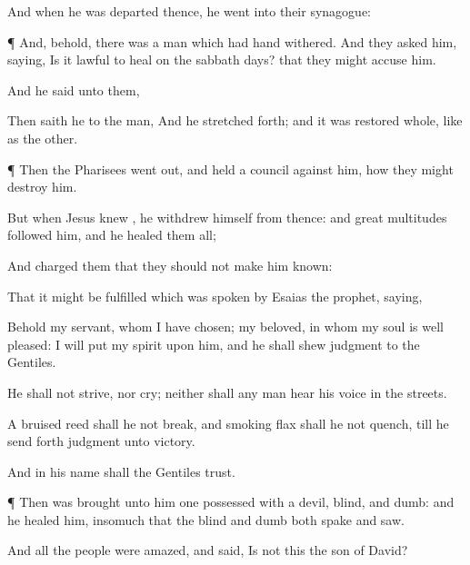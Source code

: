 {

And when he was
departed
thence, he
went
into
their
synagogue:


\par }{\PP {}¶
And,
behold, there
was a
man which
had
{}
hand
withered.
And they
asked
him,
saying, Is it
lawful to
heal on the sabbath
days?
that they might
accuse
him.

And
he
said unto
them,
{}


Then saith
he to the
man,
{}
And he
stretched
{}
forth;
and it was
restored
whole, like
as the
other.


\par }{\PP {}¶
Then the
Pharisees went
out, and
held a
council
against
him,
how they might
destroy
him.

But
when
Jesus
knew
{}, he withdrew
himself from
thence:
and
great
multitudes
followed
him,
and he
healed
them
all;

And
charged
them
that they
should
not
make
him
known:

That it might be
fulfilled which was
spoken
by
Esaias the
prophet,
saying,

Behold
my
servant,
whom I have
chosen;
my
beloved,
in
whom
my
soul is well
pleased: I will
put
my
spirit
upon
him,
and he shall
shew
judgment to the
Gentiles.

He
shall
not
strive,
nor
cry;
neither
shall any
man
hear
his
voice
in the
streets.

A
bruised
reed shall
he
not
break,
and
smoking
flax shall
he
not
quench,
till he send
forth
judgment
unto
victory.

And
in
his
name
shall the
Gentiles
trust.


\par }{\PP {}¶
Then was
brought unto
him one possessed with a
devil,
blind,
and
dumb:
and he
healed
him, insomuch
that the
blind
and
dumb
both
spake
and
saw.

And
all the
people were
amazed,
and
said,
Is
not
this the
son of
David?

}
